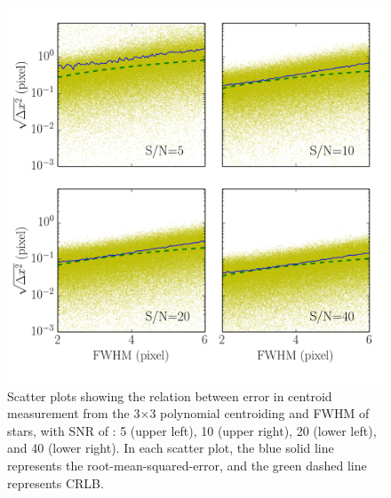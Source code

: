 \documentclass[12pt, preprint]{aastex}
\begin{document}
\begin{figure}[!htb]
  \includegraphics[width=\linewidth]{fwhm_psfpix28poly.png}
\endminipage
\caption{Scatter plots showing the relation between error in centroid measurement
from the 3$\times$3 polynomial centroiding and FWHM of stars, with SNR  of 
: 5 (upper left), 10 (upper right), 20 (lower left), and 40 (lower right). In each
scatter plot, the blue solid
 line represents the root-mean-squared-error, and the green dashed line represents CRLB.}\label{7}
\end{figure}
\end{document}
